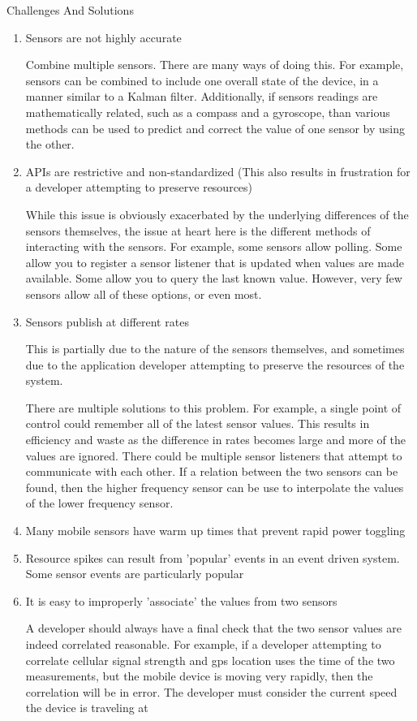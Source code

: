 \documentclass[11pt]{article}
\begin{document}
Challenges And Solutions
\begin{enumerate}
	\item Sensors are not highly accurate

	Combine multiple sensors. There are many ways of doing this. For example, sensors can be combined to include one 	overall state of the device, in a manner similar to a Kalman filter. Additionally, if sensors readings are mathematically 	related, such as a compass and a gyroscope, than various methods can be used to predict and correct the value of 
	one sensor by using the other. %

	\item APIs are restrictive and non-standardized (This also results in frustration for a developer attempting to preserve 		resources)
	
	While this issue is obviously exacerbated by the underlying differences of the sensors themselves, the issue at heart 	here is the different methods of interacting with the sensors. For example, some sensors allow polling. Some allow you 	to register a sensor listener that is updated when values are made available. Some allow you to query the last known 	value. However, very few sensors allow all of these options, or even most. 
	
		
	\item Sensors publish at different rates
	
	This is partially due to the nature of the sensors themselves, and sometimes due to the application developer 		attempting to preserve the resources of the system. 
	
	There are multiple solutions to this problem. For example, a single point of control could remember all of the latest 		sensor values. This results in efficiency and waste as the difference in rates becomes large and more of the values are 	ignored. There could be multiple sensor listeners that attempt to communicate with each other. If a relation between the 	two sensors can be found, then the higher frequency sensor can be use to interpolate the values of the lower 		frequency sensor. 
	
	\item Many mobile sensors have warm up times that prevent rapid power toggling 
	\item Resource spikes can result from 'popular' events in an event driven system. Some sensor events are particularly popular
	\item It is easy to improperly 'associate' the values from two sensors
	
	A developer should always have a final check that the two sensor values are indeed correlated reasonable. For 		example, if a developer attempting to correlate cellular signal strength and gps location uses the time of the two 		measurements, but the mobile device is moving very rapidly, then the correlation will be in error. The developer must 	consider the current speed the device is traveling at
\end{enumerate}
\end{document}
